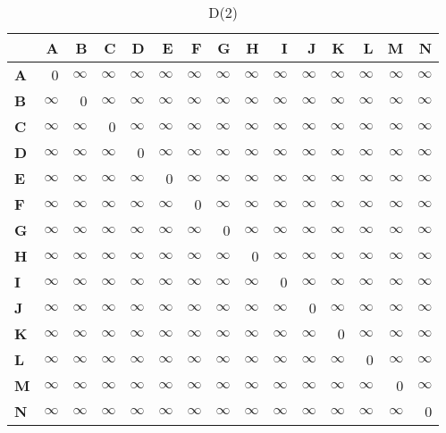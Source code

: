 \documentclass{article}
\newcommand{\INF}{$\infty$}
\begin{document}
\begin{table}[H]\centering
\caption{D(2)}
\begin{tabular}{l r r r r r r r r r r r r r r}
\toprule
 & \textbf{A} & \textbf{B} & \textbf{C} & \textbf{D} & \textbf{E} & \textbf{F} & \textbf{G} & \textbf{H} & \textbf{I} & \textbf{J} & \textbf{K} & \textbf{L} & \textbf{M} & \textbf{N}\\\midrule
\textbf{A} & 0 & \INF & \INF & \INF & \INF & \INF & \INF & \INF & \INF & \INF & \INF & \INF & \INF & \INF \\
\textbf{B} & \INF & 0 & \INF & \INF & \INF & \INF & \INF & \INF & \INF & \INF & \INF & \INF & \INF & \INF \\
\textbf{C} & \INF & \INF & 0 & \INF & \INF & \INF & \INF & \INF & \INF & \INF & \INF & \INF & \INF & \INF \\
\textbf{D} & \INF & \INF & \INF & 0 & \INF & \INF & \INF & \INF & \INF & \INF & \INF & \INF & \INF & \INF \\
\textbf{E} & \INF & \INF & \INF & \INF & 0 & \INF & \INF & \INF & \INF & \INF & \INF & \INF & \INF & \INF \\
\textbf{F} & \INF & \INF & \INF & \INF & \INF & 0 & \INF & \INF & \INF & \INF & \INF & \INF & \INF & \INF \\
\textbf{G} & \INF & \INF & \INF & \INF & \INF & \INF & 0 & \INF & \INF & \INF & \INF & \INF & \INF & \INF \\
\textbf{H} & \INF & \INF & \INF & \INF & \INF & \INF & \INF & 0 & \INF & \INF & \INF & \INF & \INF & \INF \\
\textbf{I} & \INF & \INF & \INF & \INF & \INF & \INF & \INF & \INF & 0 & \INF & \INF & \INF & \INF & \INF \\
\textbf{J} & \INF & \INF & \INF & \INF & \INF & \INF & \INF & \INF & \INF & 0 & \INF & \INF & \INF & \INF \\
\textbf{K} & \INF & \INF & \INF & \INF & \INF & \INF & \INF & \INF & \INF & \INF & 0 & \INF & \INF & \INF \\
\textbf{L} & \INF & \INF & \INF & \INF & \INF & \INF & \INF & \INF & \INF & \INF & \INF & 0 & \INF & \INF \\
\textbf{M} & \INF & \INF & \INF & \INF & \INF & \INF & \INF & \INF & \INF & \INF & \INF & \INF & 0 & \INF \\
\textbf{N} & \INF & \INF & \INF & \INF & \INF & \INF & \INF & \INF & \INF & \INF & \INF & \INF & \INF & 0 \\
\bottomrule
\end{tabular}
\end{table}
\end{document}
